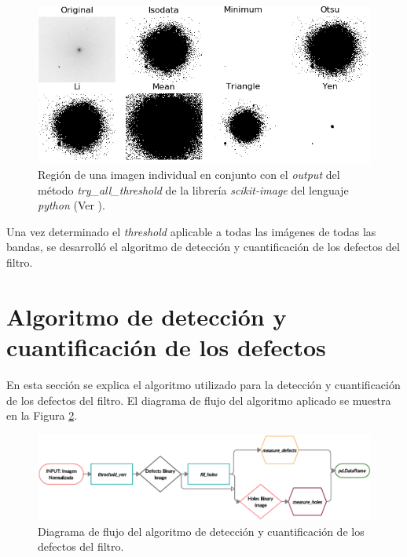 \begin{enumerate}
\begin{figure}[H]
	\centering
	\includegraphics[scale=0.8]{Figs/defectosZEISS/thresh_vivos_compar3.png}
	\caption{Región de una imagen individual en conjunto con el \textit{output} del método \textit{try\_all\_threshold} de la librería \textit{scikit-image} del lenguaje \textit{python} (Ver \href{https://github.com/jrr1984/defects_analysis/blob/master/MAIN/try_all_thresholds.py}{\faGithub}).} 
	\label{fig:threshcom2}
\end{figure}
\end{enumerate}
\hspace{0.5cm}Una vez determinado el \textit{threshold} aplicable a todas las imágenes de todas las bandas, se desarrolló el algoritmo de detección y cuantificación de los defectos del filtro.

\singlespacing
\section{Algoritmo de detección y cuantificación de los defectos \href{https://github.com/jrr1984/defects_analysis/blob/master/MAIN/defects_thresholding.py}{\faGithub}}
\label{sec:secalg}

\hspace{0.5cm}En esta sección se explica el algoritmo utilizado para la detección y cuantificación de los defectos del filtro. El diagrama de flujo del algoritmo aplicado se muestra en la Figura \ref{fig:diagflujoalgor}. 

\begin{figure}[H]
\centering
\includegraphics[scale=0.75]{Figs/cuantificaciondefectos/diag_flujoalgor.png}
\caption{Diagrama de flujo del algoritmo de detección y cuantificación de los defectos del filtro.}
\label{fig:diagflujoalgor}
\end{figure}



